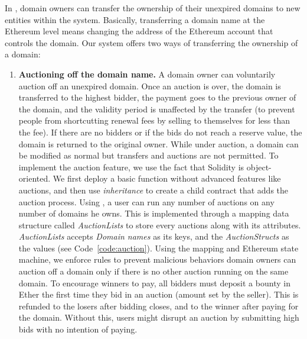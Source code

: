 \noindent In \Ghazalstar, domain owners can transfer the ownership of their unexpired domains to new entities within the system. Basically, transferring a domain name at the Ethereum level means changing the address of the Ethereum account that controls the domain. Our system offers two ways of transferring the ownership of a domain:

\begin{enumerate}

\item \textbf{Auctioning off the domain name.} A domain owner can voluntarily auction off an unexpired domain. Once an auction is over, the domain is transferred to the highest bidder, the payment goes to the previous owner of the domain, and the validity period is unaffected by the transfer (to prevent people from shortcutting renewal fees by selling to themselves for less than the fee). If there are no bidders or if the bids do not reach a reserve value, the domain is returned to the original owner. While under auction, a domain can be modified as normal but transfers and auctions are not permitted. To implement the auction feature, we use the fact that Solidity is object-oriented. We first deploy a basic \Ghazal function without advanced features like auctions, and then use \textit{inheritance} to create a child contract \Ghazalstar that adds the auction process. Using \Ghazalstar, a user can run any number of auctions on any number of domains he owns. This is implemented through a mapping data structure called \textit{AuctionLists} to store every auctions along with its attributes. \textit{AuctionLists} accepts \textit{Domain names} as its keys, and the \textit{AuctionStructs} as the values (see Code~\ref{code:auction}). Using the mapping and Ethereum state machine, we enforce rules to prevent malicious behaviors \eg domain owners can auction off a domain only if there is no other auction running on the same domain. To encourage winners to pay, all bidders must deposit a bounty in Ether the first time they bid in an auction (amount set by the seller). This is refunded to the losers after bidding closes, and to the winner after paying for the domain. Without this, users might disrupt an auction by submitting high bids with no intention of paying. 



\end{enumerate}
